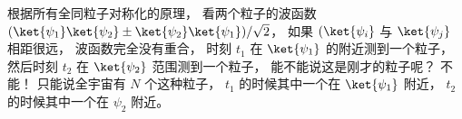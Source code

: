根据所有全同粒子对称化的原理， 看两个粒子的波函数 $(\ket{\psi_1}\ket{\psi_2} \pm \ket{\psi_2}\ket{\psi_1})/\sqrt{2}$， 如果 $(\ket{\psi_i}$ 与 $\ket{\psi_j}$ 相距很远， 波函数完全没有重合， 时刻 $t_1$ 在 $\ket{\psi_1}$ 的附近测到一个粒子， 然后时刻 $t_2$ 在 $\ket{\psi_2}$ 范围测到一个粒子， 能不能说这是刚才的粒子呢？ 不能！ 只能说全宇宙有 $N$ 个这种粒子， $t_1$ 的时候其中一个在 $\ket{\psi_1}$ 附近， $t_2$ 的时候其中一个在 $\psi_2$ 附近。
